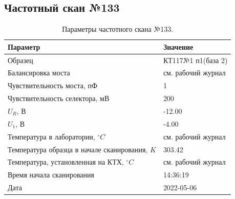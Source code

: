 \subsection{Частотный скан №133}
\begin{table}[!ht]
    \centering
    \caption{Параметры частотного скана №133.}
    \begin{tabular}{|l|l|}
        \hline
        Параметр                                       & Значение                  \\ \hline
        Образец                                        & КТ117№1 п1(база 2)        \\ \hline
        Балансировка моста                             & см. рабочий журнал        \\ \hline
        Чувствительность моста, пФ                     & 1                         \\ \hline
        Чувствительность селектора, мВ                 & 200                       \\ \hline
        $U_R$, В                                       & -12.00                    \\ \hline
        $U_1$, В                                       & -4.00                     \\ \hline
        Температура в лаборатории, $^\circ C$          & см. рабочий журнал        \\ \hline
        Температура образца в начале сканирования, $K$ & 303.42                    \\ \hline
        Температура, установленная на КТХ, $^\circ C$  & см. рабочий журнал        \\ \hline
        Время начала сканирования                      & 14:36:19                  \\ \hline
        Дата                                           & 2022-05-06                \\ \hline
    \end{tabular}
    \label{table:frequency_scan_133}
\end{table}

